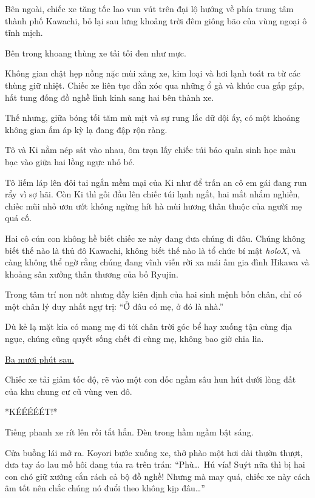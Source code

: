 \documentclass[../main.tex]{subfiles}
\begin{document}
Bên ngoài, chiếc xe tăng tốc lao vun vút trên đại lộ hướng về phía trung tâm thành phố Kawachi, bỏ lại sau lưng khoảng trời đêm giông bão của vùng ngoại ô tĩnh mịch.

\ct

Bên trong khoang thùng xe tải tối đen như mực.

Không gian chật hẹp nồng nặc mùi xăng xe, kim loại và hơi lạnh toát ra từ các thùng giữ nhiệt. Chiếc xe liên tục dằn xóc qua những ổ gà và khúc cua gấp gáp, hất tung đống đồ nghề lỉnh kỉnh sang hai bên thành xe.

Thế nhưng, giữa bóng tối tăm mù mịt và sự rung lắc dữ dội ấy, có một khoảng không gian ấm áp kỳ lạ đang đập rộn ràng.

Tô và Ki nằm nép sát vào nhau, ôm trọn lấy chiếc túi bảo quản sinh học màu bạc vào giữa hai lồng ngực nhỏ bé.

Tô liếm láp lên đôi tai ngắn mềm mại của Ki như để trấn an cô em gái đang run rẩy vì sợ hãi. Còn Ki thì gối đầu lên chiếc túi lạnh ngắt, hai mắt nhắm nghiền, chiếc mũi nhỏ ươn ướt không ngừng hít hà mùi hương thân thuộc của người mẹ quá cố.

Hai cô cún con không hề biết chiếc xe này đang đưa chúng đi đâu. Chúng không biết thế nào là thủ đô Kawachi, không biết thế nào là tổ chức bí mật \textit{holoX}, và càng không thể ngờ rằng chúng đang vĩnh viễn rời xa mái ấm gia đình Hikawa và khoảng sân xưởng thân thương của bố Ryujin.

Trong tâm trí non nớt nhưng đầy kiên định của hai sinh mệnh bốn chân, chỉ có một chân lý duy nhất ngự trị: ``Ở đâu có mẹ, ở đó là nhà.''

Dù kẻ lạ mặt kia có mang mẹ đi tới chân trời góc bể hay xuống tận cùng địa ngục, chúng cũng quyết sống chết đi cùng mẹ, không bao giờ chia lìa.

\begin{center}
    \uline{Ba mươi phút sau.}
\end{center}

Chiếc xe tải giảm tốc độ, rẽ vào một con dốc ngầm sâu hun hút dưới lòng đất của khu chung cư cũ vùng ven đô.

*KÉÉÉÉÉT!*

Tiếng phanh xe rít lên rồi tắt hẳn. Đèn trong hầm ngầm bật sáng.

Cửa buồng lái mở ra. Koyori bước xuống xe, thở phào một hơi dài thườn thượt, đưa tay áo lau mồ hôi đang túa ra trên trán: ``Phù\dots\ Hú vía! Suýt nữa thì bị hai con chó giữ xưởng cắn rách cả bộ đồ nghề! Nhưng mà may quá, chiếc xe này cách âm tốt nên chắc chúng nó đuổi theo không kịp đâu\dots''
\end{document}
